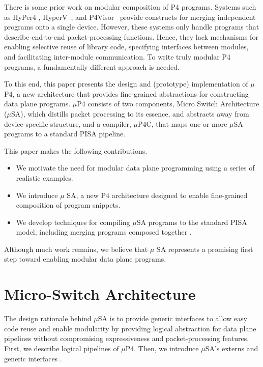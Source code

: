 There is some prior work on modular composition of P4 programs.
Systems such as HyPer4 \cite{Hancock:2016:HUP:2999572.2999607},
HyperV~\cite{8038396}, and
P4Visor~\cite{Zheng:2018:PLV:3281411.3281436} provide constructs for
merging independent programs onto a single device. However, these
systems only handle programs that describe end-to-end
packet-processing functions. Hence, they lack mechanisms for enabling
selective reuse of library code, specifying interfaces between
modules, and facilitating inter-module communication. To write truly
modular P4 programs, a fundamentally different approach is needed.

To this end, this paper presents the design and (prototype)
implementation of $\mu$P4, a new architecture that provides
fine-grained abstractions for constructing data plane programs.
$\mu$P4 consists of two components, Micro Switch Architecture
($\mu$SA), which distills packet processing to its essence, and
abstracts away from device-specific structure, and a compiler,
$\mu$P4C, that maps one or more $\mu$SA programs to a standard PISA
pipeline. 

This paper makes the following contributions.
\begin{itemize}
\item We motivate the need for modular data plane programming using a
  series of realistic examples.
\item We introduce $\mu$ SA, a new P4 architecture designed to enable
  fine-grained composition of program snippets.
\item We develop techniques for compiling $\mu$SA programs to the
  standard PISA model, including merging programs composed together 
  .
\end{itemize}

Although much work remains, we believe that $\mu$ SA represents a
promising first step toward enabling modular data plane programs.

\section{Micro-Switch Architecture}
\label{section:micros-awitch-architecture}
The design rationale behind $\mu$SA is to provide generic interfaces to allow easy code reuse and enable modularity by providing logical abstraction for data plane pipelines without compromising expressiveness and packet-processing features.
First, we describe logical pipelines of $\mu$P4. 
Then, we introduce $\mu$SA's externs and generic interfaces .


